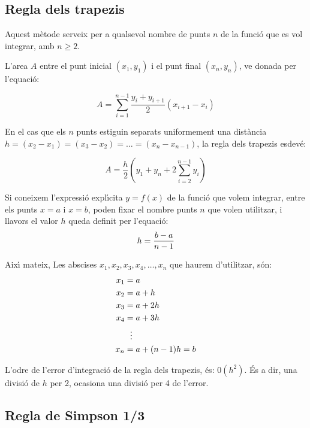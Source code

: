 \subsection{Regla dels trapezis}

Aquest m\`{e}tode serveix per a qualsevol nombre de punts $n$ de la funci\'{o} que es vol integrar, amb $n \geq 2$.

L'area $A$ entre el punt inicial $(x_1, y_1)$ i el punt final $(x_n, y_n)$, ve donada per l'equaci\'{o}:

 \begin{equation}
    A = \sum_{i=1}^{n-1} \frac{y_i + y_{i+1}}{2} (x_{i+1}-x_i)
 \end{equation}

En el cas que els $n$ punts estiguin separats uniformement una dist\`{a}ncia $h = (x_2-x_1) = (x_3-x_2) = \dots = (x_n-x_{n-1})$, la regla dels trapezis esdev\'{e}:

 \begin{equation}\label{eq:trap}
    A = \frac{h}{2} \left( y_1 + y_n + 2 \sum_{i=2}^{n-1} y_i \right)
 \end{equation}

Si coneixem l'expressi\'{o} expl\'{\i}cita $y=f(x)$ de la funci\'{o} que volem integrar, entre els punts $x=a$ i $x=b$, poden fixar el nombre punts $n$ que volen utilitzar, i llavors el valor $h$ queda definit per l'equaci\'{o}:
\begin{equation}\label{eq:trap_1}
    h = \frac{b-a}{n-1}\\
\end{equation}

Aix\'{\i} mateix, Les abscises $x_1, x_2, x_3,x_4, \dotsc , x_n$ que haurem d'utilitzar, s\'{o}n:
\begin{align}\label{eq:trap_2}
    x_1 &= a \notag\\
    x_2 &= a + h \notag\\
    x_3 &= a + 2 h \notag\\
    x_4 &= a + 3 h\\
    {} &\hspace{1.5ex}\vdots {} \notag\\
    x_n &= a + (n-1)h =b \notag
\end{align}

L'odre de l'error d'integraci\'{o} de la regla dels trapezis, \'{e}s: $0(h^2)$. \'{E}s a dir, una divisi\'{o} de $h$ per 2, ocasiona una divisi\'{o} per 4 de l'error.

\subsection{Regla de Simpson 1/3}

